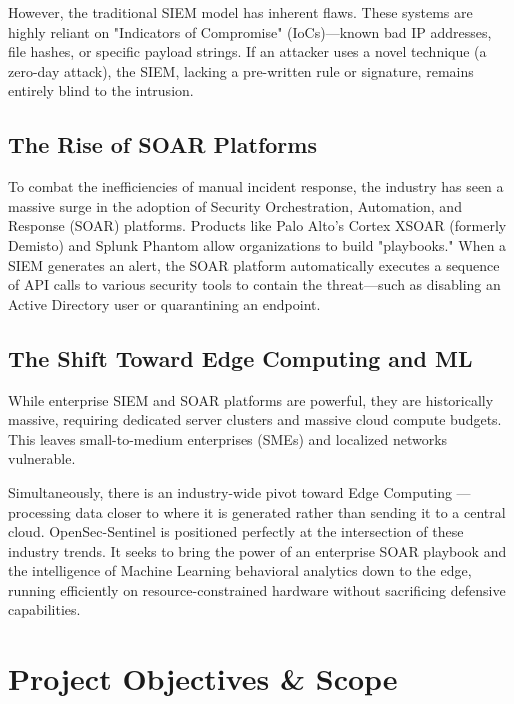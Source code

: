 \documentclass[12pt, a4paper]{report}
\begin{document}
	However, the traditional SIEM model has inherent flaws. These systems are highly reliant on "Indicators of Compromise" (IoCs)—known bad IP addresses, file hashes, or specific payload strings. If an attacker uses a novel technique (a zero-day attack), the SIEM, lacking a pre-written rule or signature, remains entirely blind to the intrusion.
	
	\section{The Rise of SOAR Platforms}
	To combat the inefficiencies of manual incident response, the industry has seen a massive surge in the adoption of Security Orchestration, Automation, and Response (SOAR) platforms. Products like Palo Alto's Cortex XSOAR (formerly Demisto) and Splunk Phantom allow organizations to build "playbooks." When a SIEM generates an alert, the SOAR platform automatically executes a sequence of API calls to various security tools to contain the threat—such as disabling an Active Directory user or quarantining an endpoint.
	
	\section{The Shift Toward Edge Computing and ML}
	While enterprise SIEM and SOAR platforms are powerful, they are historically massive, requiring dedicated server clusters and massive cloud compute budgets. This leaves small-to-medium enterprises (SMEs) and localized networks vulnerable.
	
	Simultaneously, there is an industry-wide pivot toward Edge Computing — processing data closer to where it is generated rather than sending it to a central cloud. OpenSec-Sentinel is positioned perfectly at the intersection of these industry trends. It seeks to bring the power of an enterprise SOAR playbook and the intelligence of Machine Learning behavioral analytics down to the edge, running efficiently on resource-constrained hardware without sacrificing defensive capabilities.
	
	\chapter{Project Objectives \& Scope}
	\onehalfspacing
	
\end{document}
